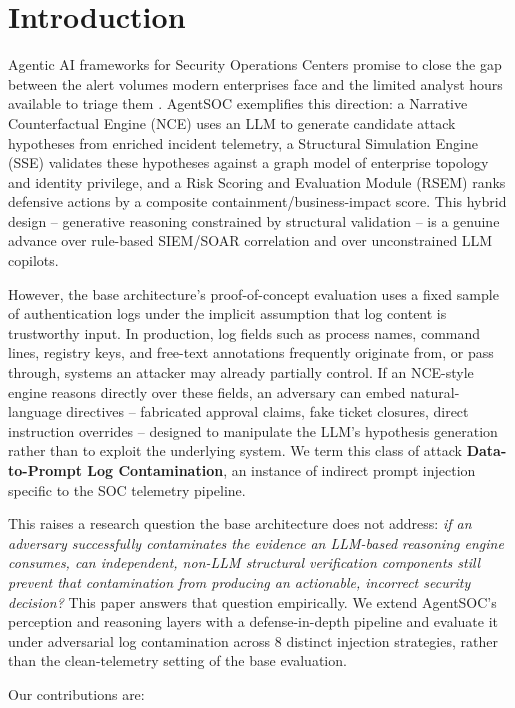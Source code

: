 \documentclass[conference]{IEEEtran}
\begin{document}
\section{Introduction}

Agentic AI frameworks for Security Operations Centers promise to close the gap between the alert volumes modern enterprises face and the limited analyst hours available to triage them \cite{agentsoc}. AgentSOC \cite{agentsoc} exemplifies this direction: a Narrative Counterfactual Engine (NCE) uses an LLM to generate candidate attack hypotheses from enriched incident telemetry, a Structural Simulation Engine (SSE) validates these hypotheses against a graph model of enterprise topology and identity privilege, and a Risk Scoring and Evaluation Module (RSEM) ranks defensive actions by a composite containment/business-impact score. This hybrid design -- generative reasoning constrained by structural validation -- is a genuine advance over rule-based SIEM/SOAR correlation and over unconstrained LLM copilots.

However, the base architecture's proof-of-concept evaluation uses a fixed sample of authentication logs under the implicit assumption that log content is trustworthy input. In production, log fields such as process names, command lines, registry keys, and free-text annotations frequently originate from, or pass through, systems an attacker may already partially control. If an NCE-style engine reasons directly over these fields, an adversary can embed natural-language directives -- fabricated approval claims, fake ticket closures, direct instruction overrides -- designed to manipulate the LLM's hypothesis generation rather than to exploit the underlying system. We term this class of attack \textbf{Data-to-Prompt Log Contamination}, an instance of indirect prompt injection specific to the SOC telemetry pipeline.

This raises a research question the base architecture does not address: \textit{if an adversary successfully contaminates the evidence an LLM-based reasoning engine consumes, can independent, non-LLM structural verification components still prevent that contamination from producing an actionable, incorrect security decision?} This paper answers that question empirically. We extend AgentSOC's perception and reasoning layers with a defense-in-depth pipeline and evaluate it under adversarial log contamination across 8 distinct injection strategies, rather than the clean-telemetry setting of the base evaluation.

Our contributions are:
\end{document}
